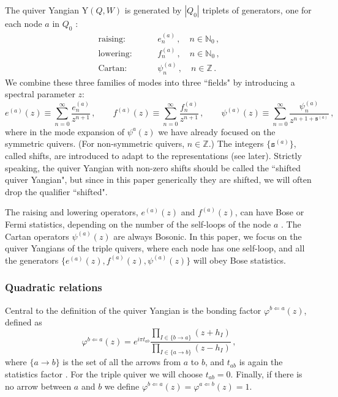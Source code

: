 \documentclass[12pt,a4paper]{article}
\renewcommand{\(}{\left(}
\renewcommand{\)}{\right)}
\renewcommand{\(}{\left(}
\renewcommand{\)}{\right)}
\begin{document}
The quiver Yangian Y$(Q,W)$ is generated by $|Q_0|$ triplets of generators, one for each node $a$ in $Q_0$ \cite{Li:2020rij}:
\begin{equation}
	\begin{aligned}
		\mathrm{raising:}\qquad& e^{(a)}_n\,,\quad n\in \mathbb{N}_0\,,\\ 
		\mathrm{lowering:}\qquad& f^{(a)}_n\,,\quad n\in \mathbb{N}_0\,,\\ 
		\mathrm{Cartan:}\qquad& \psi^{(a)}_n\,,\quad n\in \mathbb{Z}\,.
	\end{aligned}
\end{equation}
We combine these three families of modes into three ``fields" by introducing   a spectral parameter $z$:
\begin{equation}\label{eq:QY_mode_expansion}
	e^{(a)}(z)\equiv \sum_{n=0}^{\infty}\frac{e^{(a)}_n}{z^{n+1}}\,,\qquad      f^{(a)}(z)\equiv \sum_{n=0}^{\infty}\frac{f^{(a)}_n}{z^{n+1}}\,,\qquad \psi^{(a)}(z)\equiv \sum_{n=0}^{\infty}\frac{\psi^{(a)}_n}{z^{n+1+\mathtt{s}^{(a)}}}\,, 
\end{equation}
where in the mode expansion of $\psi^{a}(z)$ we have already focused on the symmetric quivers. 
(For non-symmetric quivers, $n\in \mathbb{Z}$.)
The integers $\{\mathtt{s}^{(a)}\}$, called shifts, 
are introduced to adapt to the representations (see later). 
Strictly speaking, the quiver Yangian with non-zero shifts should be called the ``shifted quiver Yangian", but since in this paper generically they are  shifted, we will often drop the qualifier ``shifted".


The raising  and lowering operators, $e^{(a)}(z)$ and $f^{(a)}(z)$, can have Bose or Fermi statistics, depending on the number of the self-loops of the node $a$ \cite{Li:2020rij,Li:2023zub}. 
The Cartan operators $\psi^{(a)}(z)$ are always Bosonic. 
In this paper, we focus on the quiver Yangians of the triple quivers,  where each node has one self-loop, and all the generators $\{e^{(a)}(z),f^{(a)}(z),\psi^{(a)}(z)\}$ will obey Bose statistics.



\subsubsection{Quadratic relations}
\label{sssec:Qurdratic}

Central to the definition of the quiver Yangian is the bonding factor $\varphi^{b\Leftarrow a}(z)$, defined as
\begin{equation}\label{eq:QY_bond}
	\varphi^{b\Leftarrow a}(z)=e^{i\pi t_{ab}}\frac{\prod_{I\in\{b\to a\}}(z+h_I)}{\prod_{I\in\{a\to b\}}(z-h_I)}\,,
\end{equation}
where $\{a\to b\}$ is the set of all the arrows from $a$ to $b$, and $t_{ab}$ is again the statistics factor \cite{Li:2023zub}. 
For the triple quiver we will choose $t_{ab}=0$. 
Finally, if there is no arrow between $a$ and $b$ we define $\varphi^{b\Leftarrow a}(z)=\varphi^{a\Leftarrow b}(z)=1$.
\end{document}
